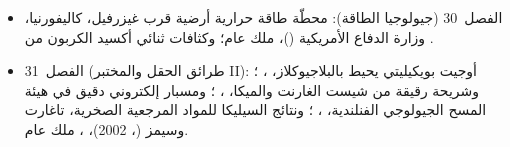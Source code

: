 \begin{itemize}
  \item الفصل~30 (جيولوجيا الطاقة): محطّة طاقة حرارية أرضية قرب غيزرفيل، كاليفورنيا، وزارة الدفاع الأمريكية ()، ملك عام؛ وكثافات ثنائي أكسيد الكربون من .
  \item الفصل~31 (طرائق الحقل والمختبر II): أوجيت بويكيليتي يحيط بالبلاجيوكلاز، ، ؛ وشريحة رقيقة من شيست الغارنت والميكا، ، ؛ ومسبار إلكتروني دقيق في هيئة المسح الجيولوجي الفنلندية، ، ؛ ونتائج السيليكا للمواد المرجعية الصخرية، تاغارت وسيمز (، 2002)، ، ملك عام.
\end{itemize}
